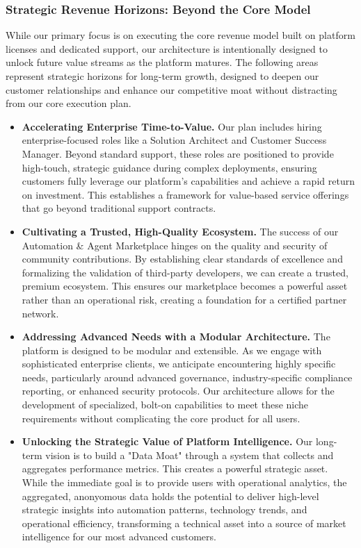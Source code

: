 \documentclass[11pt, a4paper, oneside]{article}
\begin{document}
\subsubsection{Strategic Revenue Horizons: Beyond the Core Model}

\justifying
While our primary focus is on executing the core revenue model built on platform licenses and dedicated support, our architecture is intentionally designed to unlock future value streams as the platform matures. The following areas represent strategic horizons for long-term growth, designed to deepen our customer relationships and enhance our competitive moat without distracting from our core execution plan.

\begin{itemize}[leftmargin=*, topsep=2pt, itemsep=4pt]

    \item \textbf{Accelerating Enterprise Time-to-Value.} Our plan includes hiring enterprise-focused roles like a Solution Architect and Customer Success Manager. Beyond standard support, these roles are positioned to provide high-touch, strategic guidance during complex deployments, ensuring customers fully leverage our platform's capabilities and achieve a rapid return on investment. This establishes a framework for value-based service offerings that go beyond traditional support contracts.

    \item \textbf{Cultivating a Trusted, High-Quality Ecosystem.} The success of our Automation \& Agent Marketplace hinges on the quality and security of community contributions. By establishing clear standards of excellence and formalizing the validation of third-party developers, we can create a trusted, premium ecosystem. This ensures our marketplace becomes a powerful asset rather than an operational risk, creating a foundation for a certified partner network.

    \item \textbf{Addressing Advanced Needs with a Modular Architecture.} The platform is designed to be modular and extensible. As we engage with sophisticated enterprise clients, we anticipate encountering highly specific needs, particularly around advanced governance, industry-specific compliance reporting, or enhanced security protocols. Our architecture allows for the development of specialized, bolt-on capabilities to meet these niche requirements without complicating the core product for all users.

    \item \textbf{Unlocking the Strategic Value of Platform Intelligence.} Our long-term vision is to build a "Data Moat" through a system that collects and aggregates performance metrics. This creates a powerful strategic asset. While the immediate goal is to provide users with operational analytics, the aggregated, anonyomous data holds the potential to deliver high-level strategic insights into automation patterns, technology trends, and operational efficiency, transforming a technical asset into a source of market intelligence for our most advanced customers.

\end{itemize}
\end{document}
